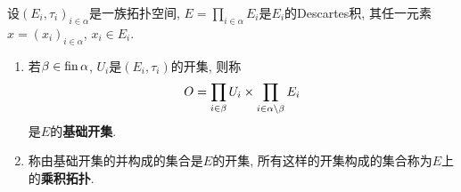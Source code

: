     \begin{Definition}[乘积拓扑]\label{def:乘积拓扑}
        设$ (E_i,\tau_i)_{i\in\alpha} $是一族拓扑空间, $ E=\prod\limits_{i\in\alpha}E_i $是$ E_i $的Descartes积, 其任一元素$ x=(x_i)_{i\in\alpha} $, $ x_i\in E_i $.
        \begin{enumerate}[(1)]
            \item 若$ \beta\in\operatorname{fin}\alpha $, $ U_i $是$ (E_i,\tau_i) $的开集, 则称
            \[
                O=\prod_{i\in\beta}U_i\times\prod_{i\in\alpha\setminus\beta}E_i
            \]
            是$ E $的\textbf{基础开集}.

            \item\label{item:乘积拓扑任意并} 称由基础开集的并构成的集合是$ E $的开集, 所有这样的开集构成的集合称为$ E $上的\textbf{乘积拓扑}.
        \end{enumerate}
    \end{Definition}

